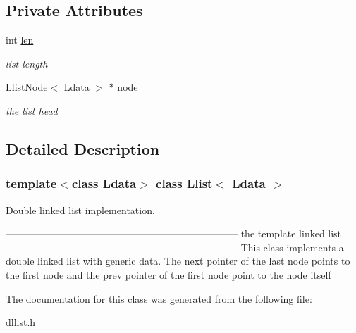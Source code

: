 \subsection*{Private Attributes}
\begin{CompactItemize}
\item 
\hypertarget{classLlist_15efb1e209596ba50b865a7809f72783}{
int \hyperlink{classLlist_15efb1e209596ba50b865a7809f72783}{len}}
\label{classLlist_15efb1e209596ba50b865a7809f72783}

\begin{CompactList}\small\item\em list length \item\end{CompactList}\item 
\hypertarget{classLlist_3c383a2a2ed152eb6cbf451c6ca24198}{
\hyperlink{classLlistNode}{LlistNode}$<$ Ldata $>$ $\ast$ \hyperlink{classLlist_3c383a2a2ed152eb6cbf451c6ca24198}{node}}
\label{classLlist_3c383a2a2ed152eb6cbf451c6ca24198}

\begin{CompactList}\small\item\em the list head \item\end{CompactList}\end{CompactItemize}


\subsection{Detailed Description}
\subsubsection*{template$<$class Ldata$>$ class Llist$<$ Ldata $>$}

Double linked list implementation. 

----------------------------------------------------------------------- the template linked list ----------------------------------------------------------------------- This class implements a double linked list with generic data. The next pointer of the last node points to the first node and the prev pointer of the first node point to the node itself 

The documentation for this class was generated from the following file:\begin{CompactItemize}
\item 
\hyperlink{dllist_8h}{dllist.h}\end{CompactItemize}
